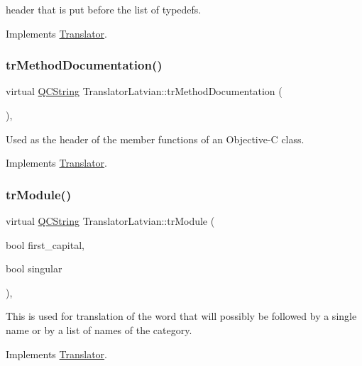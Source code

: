 header that is put before the list of typedefs. 

Implements \mbox{\hyperlink{class_translator}{Translator}}.

\mbox{\label{class_translator_latvian_ae1e2acb4bb3f93a24c92d6312fc9644a}} 
\subsubsection{\texorpdfstring{trMethodDocumentation()}{trMethodDocumentation()}}
{\footnotesize\ttfamily virtual \mbox{\hyperlink{class_q_c_string}{Q\+C\+String}} Translator\+Latvian\+::tr\+Method\+Documentation (\begin{DoxyParamCaption}{ }\end{DoxyParamCaption})\hspace{0.3cm}{\ttfamily [inline]}, {\ttfamily [virtual]}}

Used as the header of the member functions of an Objective-\/C class. 

Implements \mbox{\hyperlink{class_translator}{Translator}}.

\mbox{\label{class_translator_latvian_a6069533d4897fd837c6c1c017439d104}} 
\subsubsection{\texorpdfstring{trModule()}{trModule()}}
{\footnotesize\ttfamily virtual \mbox{\hyperlink{class_q_c_string}{Q\+C\+String}} Translator\+Latvian\+::tr\+Module (\begin{DoxyParamCaption}\item[{bool}]{first\+\_\+capital,  }\item[{bool}]{singular }\end{DoxyParamCaption})\hspace{0.3cm}{\ttfamily [inline]}, {\ttfamily [virtual]}}

This is used for translation of the word that will possibly be followed by a single name or by a list of names of the category. 

Implements \mbox{\hyperlink{class_translator}{Translator}}.

